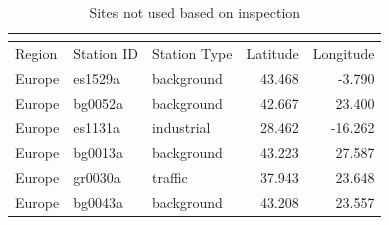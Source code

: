 \documentclass{article}
\begin{document}
\begingroup
\fontsize{12.0pt}{14.4pt}\selectfont
\begin{longtable}{lllrr}
\caption{Sites not used based on inspection} \\ 
\label{si_tab:remove_list} \\
\toprule
Region & Station ID & Station Type & Latitude & Longitude \\ 
\midrule\addlinespace[2.5pt]
Europe & es1529a & background & 43.468 & -3.790 \\ 
Europe & bg0052a & background & 42.667 & 23.400 \\ 
Europe & es1131a & industrial & 28.462 & -16.262 \\ 
Europe & bg0013a & background & 43.223 & 27.587 \\ 
Europe & gr0030a & traffic & 37.943 & 23.648 \\ 
Europe & bg0043a & background & 43.208 & 23.557 \\ 
\bottomrule
\end{longtable}
\endgroup
\end{document}
